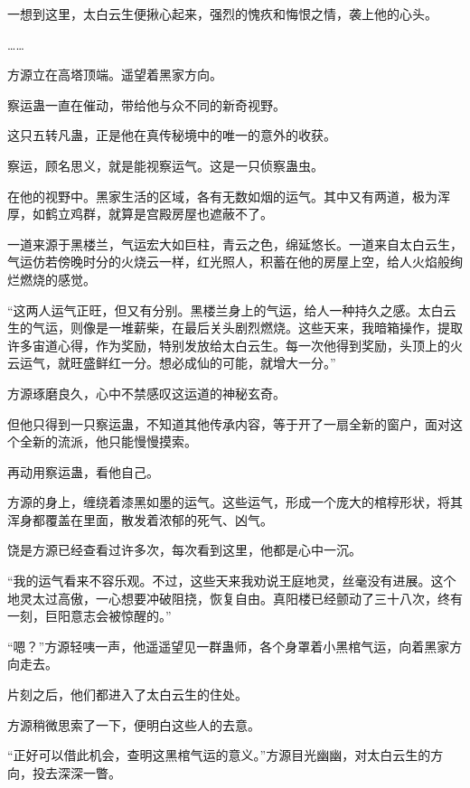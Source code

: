 \begin{this_body}
一想到这里，太白云生便揪心起来，强烈的愧疚和悔恨之情，袭上他的心头。

……

方源立在高塔顶端。遥望着黑家方向。

察运蛊一直在催动，带给他与众不同的新奇视野。

这只五转凡蛊，正是他在真传秘境中的唯一的意外的收获。

察运，顾名思义，就是能视察运气。这是一只侦察蛊虫。

在他的视野中。黑家生活的区域，各有无数如烟的运气。其中又有两道，极为浑厚，如鹤立鸡群，就算是宫殿房屋也遮蔽不了。

一道来源于黑楼兰，气运宏大如巨柱，青云之色，绵延悠长。一道来自太白云生，气运仿若傍晚时分的火烧云一样，红光照人，积蓄在他的房屋上空，给人火焰般绚烂燃烧的感觉。

“这两人运气正旺，但又有分别。黑楼兰身上的气运，给人一种持久之感。太白云生的气运，则像是一堆薪柴，在最后关头剧烈燃烧。这些天来，我暗箱操作，提取许多宙道心得，作为奖励，特别发放给太白云生。每一次他得到奖励，头顶上的火云运气，就旺盛鲜红一分。想必成仙的可能，就增大一分。”

方源琢磨良久，心中不禁感叹这运道的神秘玄奇。

但他只得到一只察运蛊，不知道其他传承内容，等于开了一扇全新的窗户，面对这个全新的流派，他只能慢慢摸索。

再动用察运蛊，看他自己。

方源的身上，缠绕着漆黑如墨的运气。这些运气，形成一个庞大的棺椁形状，将其浑身都覆盖在里面，散发着浓郁的死气、凶气。

饶是方源已经查看过许多次，每次看到这里，他都是心中一沉。

“我的运气看来不容乐观。不过，这些天来我劝说王庭地灵，丝毫没有进展。这个地灵太过高傲，一心想要冲破阻挠，恢复自由。真阳楼已经颤动了三十八次，终有一刻，巨阳意志会被惊醒的。”

“嗯？”方源轻咦一声，他遥遥望见一群蛊师，各个身罩着小黑棺气运，向着黑家方向走去。

片刻之后，他们都进入了太白云生的住处。

方源稍微思索了一下，便明白这些人的去意。

“正好可以借此机会，查明这黑棺气运的意义。”方源目光幽幽，对太白云生的方向，投去深深一瞥。

\end{this_body}

